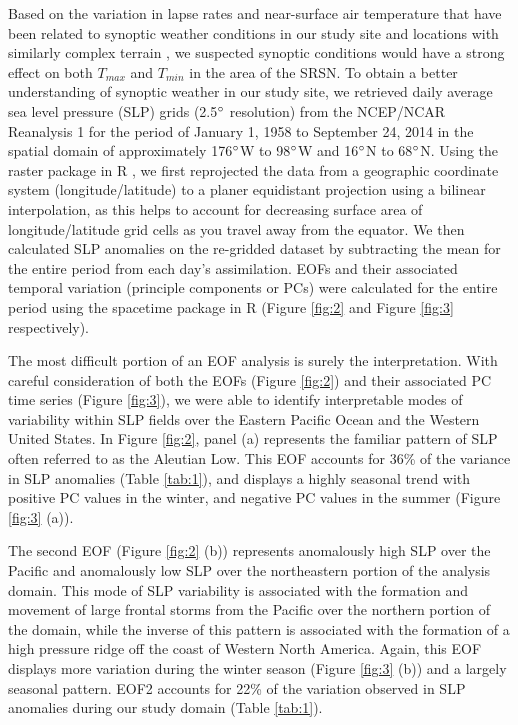 \documentclass{ametsoc}
\begin{document}
Based on the variation in lapse rates and near-surface air temperature that have
been related to synoptic weather conditions in our study site and locations with
similarly complex terrain
\citep{Lundquist2008a,Lundquist2007,Pepin2011,Blandford2008a}, we suspected
synoptic conditions would have a strong effect on both $T_{max}$ and $T_{min}$
in the area of the SRSN.  To obtain a better understanding of synoptic weather
in our study site, we retrieved daily average sea level pressure (SLP) grids
(2.5$\degree$ resolution) from the NCEP/NCAR Reanalysis 1 \citep{Kalnay1996}
for the period of January 1, 1958 to September 24, 2014 in the spatial domain of
approximately 176$\degree$W to 98$\degree$W and 16$\degree$N to 68$\degree$N.
Using the raster package in R \citep{raster2015}, we first reprojected the data from a
geographic coordinate system (longitude/latitude) to a planer equidistant
projection using a bilinear interpolation, as this helps to account for
decreasing surface area of longitude/latitude grid cells as you travel away from
the equator.  We then calculated SLP anomalies on the re-gridded dataset by
subtracting the mean for the entire period from each day's assimilation.  EOFs
and their associated temporal variation (principle components or PCs) were
calculated for the entire period using the spacetime package
\citep{Pebesma2012,Bivand2013} in R (Figure \ref{fig:2} and Figure \ref{fig:3}
respectively).

The most difficult portion of an EOF analysis is surely the interpretation.
With careful consideration of both the EOFs (Figure \ref{fig:2}) and their
associated PC time series (Figure \ref{fig:3}), we were able to identify
interpretable modes of variability within SLP fields over the Eastern Pacific
Ocean and the Western United States.  In Figure \ref{fig:2}, panel (a)
represents the familiar pattern of SLP often referred to as the Aleutian Low.
This EOF accounts for 36\% of the variance in SLP anomalies (Table \ref{tab:1}),
and displays a highly seasonal trend with positive PC values in the winter, and
negative PC values in the summer (Figure \ref{fig:3} (a)).

The second EOF (Figure \ref{fig:2} (b)) represents anomalously high SLP over the
Pacific and anomalously low SLP over the northeastern portion of the analysis
domain.  This mode of SLP variability is associated with the formation and
movement of large frontal storms from the Pacific over the northern portion of
the domain, while the inverse of this pattern is associated with the formation
of a high pressure ridge off the coast of Western North America.  Again, this
EOF displays more variation during the winter season (Figure \ref{fig:3} (b))
and a largely seasonal pattern.  EOF2 accounts for 22\% of the variation
observed in SLP anomalies during our study domain (Table \ref{tab:1}).
\end{document}
